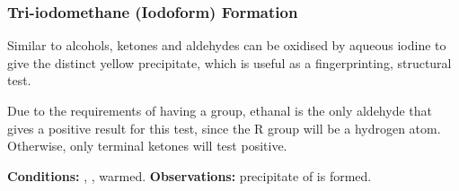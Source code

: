 



			\subsubsection{Tri-iodomethane (Iodoform) Formation}

				Similar to alcohols, ketones and aldehydes can be oxidised by aqueous iodine to give the distinct yellow precipitate, which
				is useful as a fingerprinting, structural test.

				Due to the requirements of having a  group, ethanal is the only aldehyde that gives a positive result for this test,
				since the R group will be a hydrogen atom. Otherwise, only terminal ketones will test positive.

				\vspace{1.5em}
				\vbox{\textbf{Conditions:}	\tabto{35mm}, , warmed.}
				\vbox{\textbf{Observations:}\tabto{35mm} precipitate of  is formed.}





















































